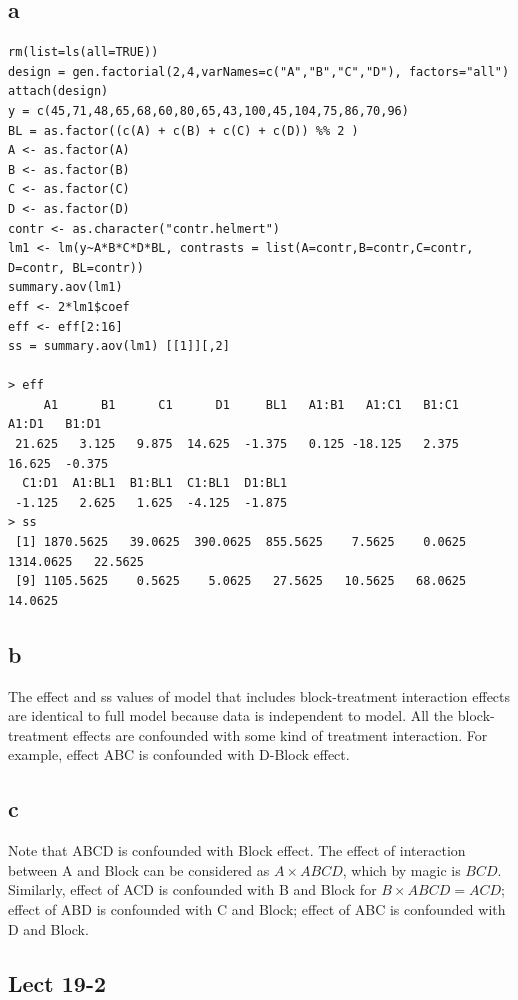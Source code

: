 \documentclass[11pt,letterpaper]{article}
\begin{document}
\subsection*{a}
\begin{verbatim}
rm(list=ls(all=TRUE))
design = gen.factorial(2,4,varNames=c("A","B","C","D"), factors="all")
attach(design)
y = c(45,71,48,65,68,60,80,65,43,100,45,104,75,86,70,96) 
BL = as.factor((c(A) + c(B) + c(C) + c(D)) %% 2 )
A <- as.factor(A)
B <- as.factor(B)
C <- as.factor(C)
D <- as.factor(D)
contr <- as.character("contr.helmert")
lm1 <- lm(y~A*B*C*D*BL, contrasts = list(A=contr,B=contr,C=contr, D=contr, BL=contr))
summary.aov(lm1)
eff <- 2*lm1$coef
eff <- eff[2:16]
ss = summary.aov(lm1) [[1]][,2]

> eff
     A1      B1      C1      D1     BL1   A1:B1   A1:C1   B1:C1   A1:D1   B1:D1 
 21.625   3.125   9.875  14.625  -1.375   0.125 -18.125   2.375  16.625  -0.375 
  C1:D1  A1:BL1  B1:BL1  C1:BL1  D1:BL1 
 -1.125   2.625   1.625  -4.125  -1.875 
> ss
 [1] 1870.5625   39.0625  390.0625  855.5625    7.5625    0.0625 1314.0625   22.5625
 [9] 1105.5625    0.5625    5.0625   27.5625   10.5625   68.0625   14.0625
\end{verbatim}

\subsection*{b}
\noindent The effect and ss values of model that includes block-treatment interaction effects are identical to full model because data is independent to model. All the block-treatment effects are confounded with some kind of treatment interaction. For example, effect ABC is confounded with D-Block effect. 

\subsection*{c}
\noindent Note that ABCD is confounded with Block effect. The effect of interaction between A and Block can be considered as $A \times ABCD$, which by magic is $BCD$. Similarly, effect of ACD is confounded with B and Block for $B \times ABCD = ACD$; effect of ABD is confounded with C and Block; effect of ABC is confounded with D and Block. 

\subsection*{Lect 19-2}
\end{document}
